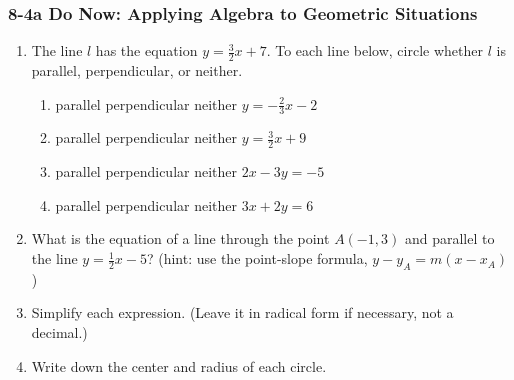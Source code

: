 \documentclass[12pt, twoside]{article}
\begin{document}
\subsubsection*{8-4a Do Now: Applying Algebra to Geometric Situations}
  \begin{enumerate}

  \item The line $l$ has the equation $y=\frac{3}{2}x+7$. To each line below, circle whether $l$ is parallel, perpendicular, or neither.
    \begin{enumerate}
      \item parallel \quad perpendicular \quad neither \qquad $y=-\frac{2}{3}x-2$
      \vspace{0.5cm}
      \item parallel \quad perpendicular \quad neither \qquad $y=\frac{3}{2}x+9$
      \vspace{0.5cm}
      \item parallel \quad perpendicular \quad neither \qquad $2x-3y=-5$
      \vspace{1.5cm}
      \item parallel \quad perpendicular \quad neither \qquad $3x+2y=6$
      \vspace{1.7cm}
    \end{enumerate}

    \item What is the equation of a line through the point $A(-1,3)$ and parallel to the line $y=\frac{1}{2}x-5$? (hint: use the point-slope formula, $y-y_A=m (x-x_A)$) \vspace{1.5cm}

  \item Simplify each expression. (Leave it in radical form if necessary, not a decimal.)
    \begin{enumerate}
    \end{enumerate}
    \vspace{0.5cm}


  \item Write down the center and radius of each circle.
    \begin{enumerate}
    \end{enumerate}  \vspace{2cm}


\end{enumerate}
\end{document}
